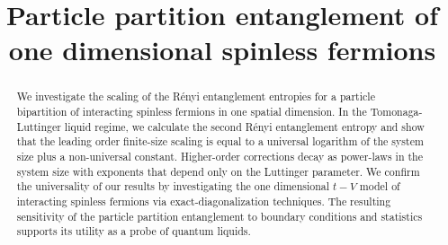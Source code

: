 


%





\title{Particle partition entanglement of one dimensional spinless fermions}

\begin{abstract}
We investigate the scaling of the R\'{e}nyi entanglement entropies for a
particle bipartition of interacting spinless fermions in one spatial dimension. In the Tomonaga-Luttinger liquid regime, we calculate the second R\'{e}nyi
entanglement entropy and show that the leading order finite-size scaling is
equal to a universal logarithm of the system size plus a non-universal
constant.  Higher-order corrections decay as power-laws in the system size
with exponents that depend only on the Luttinger parameter. We confirm the
universality of our results by investigating the one dimensional $t-V$ model of
interacting spinless fermions via exact-diagonalization techniques.  The
resulting sensitivity of the particle partition entanglement to boundary
conditions and statistics supports its utility as a probe of quantum liquids.
\end{abstract}

\maketitle

